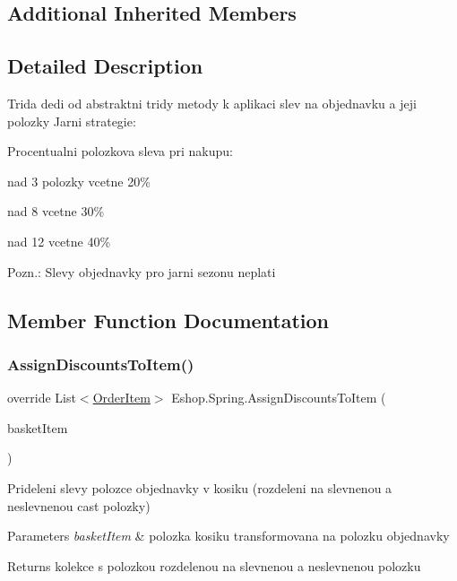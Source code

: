 \subsection*{Additional Inherited Members}


\subsection{Detailed Description}
Trida dedi od abstraktni tridy metody k aplikaci slev na objednavku a jeji polozky Jarni strategie\+: 

Procentualni polozkova sleva pri nakupu\+: 
\begin{DoxyItemize}
\item nad 3 polozky vcetne 20\%  
\item nad 8 vcetne 30\%  
\item nad 12 vcetne 40\%  
\end{DoxyItemize}Pozn.\+: Slevy objednavky pro jarni sezonu neplati 

\subsection{Member Function Documentation}
\mbox{\label{class_eshop_1_1_spring_a153afff8b69d351f44248def96bfff7c}} 
\subsubsection{\texorpdfstring{AssignDiscountsToItem()}{AssignDiscountsToItem()}}
{\footnotesize\ttfamily override List$<$\mbox{\hyperlink{class_eshop_1_1_order_item}{Order\+Item}}$>$ Eshop.\+Spring.\+Assign\+Discounts\+To\+Item (\begin{DoxyParamCaption}\item[{Key\+Value\+Pair$<$ \mbox{\hyperlink{class_eshop_1_1_product}{Product}}, int $>$}]{basket\+Item }\end{DoxyParamCaption})\hspace{0.3cm}{\ttfamily [virtual]}}



Prideleni slevy polozce objednavky v kosiku (rozdeleni na slevnenou a neslevnenou cast polozky) 


\begin{DoxyParams}{Parameters}
{\em basket\+Item} & polozka kosiku transformovana na polozku objednavky\\
\hline
\end{DoxyParams}
\begin{DoxyReturn}{Returns}
kolekce s polozkou rozdelenou na slevnenou a neslevnenou polozku
\end{DoxyReturn}


